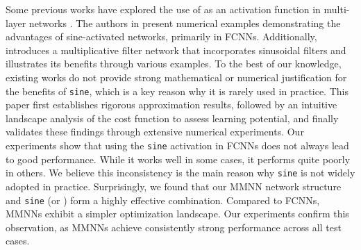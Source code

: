 \documentclass[11pt,a4paper]{article}
\begin{document}


Some previous works have explored the use of \sine{} as an activation function in multi-layer networks \cite{doi:10.1137/19M1310050,novello2024tamingfrequencyfactorysinusoidal,2025arXiv250200869M,fathony2021multiplicative,doi:10.1137/21M144431X,NEURIPS2020_53c04118}. The authors in \cite{novello2024tamingfrequencyfactorysinusoidal,2025arXiv250200869M} present numerical examples demonstrating the advantages of sine-activated networks, primarily in FCNNs. Additionally, \cite{fathony2021multiplicative} introduces a multiplicative filter network that incorporates sinusoidal filters and illustrates its benefits through various examples.
To the best of our knowledge, existing works do not provide strong mathematical or numerical justification for the benefits of \texttt{sine}, which is a key reason why it is rarely used in practice.
This paper first establishes rigorous approximation results, followed by an intuitive landscape analysis of the cost function to assess learning potential, and finally validates these findings through extensive numerical experiments. Our experiments show that using the \texttt{sine} activation in FCNNs does not always lead to good performance. While it works well in some cases, it performs quite poorly in others. We believe this inconsistency is the main reason why \texttt{sine} is not widely adopted in practice.
Surprisingly, we found that our MMNN network structure and \texttt{sine} (or ) form a highly effective combination. Compared to FCNNs, MMNNs exhibit a simpler optimization landscape. Our experiments confirm this observation, as MMNNs achieve consistently strong performance across all test cases.



\end{document}

